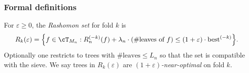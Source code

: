 \documentclass[12pt]{article}
\begin{document}
\subsubsection{Formal definitions}

\begin{definition}
\label{def:rashomon-fold}
For $\varepsilon \ge 0$, the \emph{Rashomon set} for fold $k$ is
\[
R_k(\varepsilon) = \Bigl\{ f \in \cT_{M_n} : R_n^{(-k)}(f) + \lambda_n \cdot (\#\text{leaves of } f) \le (1+\varepsilon) \cdot \text{best}^{(-k)} \Bigr\}.
\]
Optionally one restricts to trees with $\#\text{leaves} \le L_n$ so that the set is compatible with the sieve. We say trees in $R_k(\varepsilon)$ are \emph{$(1+\varepsilon)$-near-optimal} on fold $k$.
\end{definition}
\end{document}
